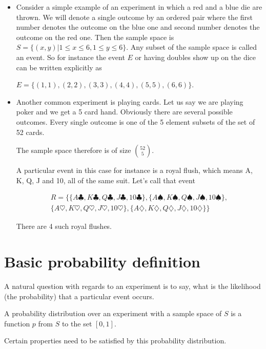 \documentclass[12pt]{article}
\begin{document}
\begin{itemize}
\item Consider a simple example of an experiment in which a red and a blue die are thrown. We will denote a single outcome by an ordered pair where the first number denotes the outcome on the blue one and second number denotes the outcome on the red one.
Then the sample space is $S = \{(x,y)| 1 \le x \le 6, 1 \le y \le 6\}$.
Any subset of the sample space is called an event. So for instance the event $E$ or having doubles show up on the dice can be written explicitly as

$E = \{(1,1), (2,2), (3,3), (4,4), (5,5), (6,6)\}$.

\item Another common experiment is playing cards. Let us say we are playing poker and we get a 5 card hand. Obviously there are several possible outcomes. Every single outcome is one of the 5 element subsets of the set of 52 cards. 

The sample space therefore is of size ${52 \choose 5}$.

A particular event in this case for instance is a royal flush, which means A, K, Q, J and 10, all of the same suit. Let's call that event 

\begin{multline*}
R = \{\{A \clubsuit, K \clubsuit, Q \clubsuit, J \clubsuit, 10 \clubsuit\} , \{A \spadesuit, K \spadesuit, Q \spadesuit, J \spadesuit, 10 \spadesuit \}, \\
\{A \heartsuit, K \heartsuit, Q \heartsuit, J \heartsuit, 10 \heartsuit \} , \{ A \diamondsuit, K \diamondsuit, Q \diamondsuit, J \diamondsuit , 10 \diamondsuit \} \}
\end{multline*} 

There are 4 such royal flushes. 

\end{itemize}

\section*{Basic probability definition}
A natural question with regards to an experiment is to say, what is the likelihood (the probability) that a particular event occurs.

A probability distribution over an experiment with a sample space of $S$ is a function $p$ from $S$ to the set $[0,1]$.

Certain properties need to be satisfied by this probability distribution.
\end{document}
